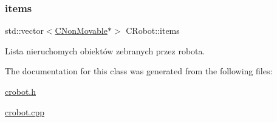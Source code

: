\subsubsection{\texorpdfstring{items}{items}}
{\footnotesize\ttfamily std\+::vector$<$\mbox{\hyperlink{class_c_non_movable}{C\+Non\+Movable}}$\ast$$>$ C\+Robot\+::items\hspace{0.3cm}{\ttfamily [protected]}}



Lista nieruchomych obiektów zebranych przez robota. 



The documentation for this class was generated from the following files\+:\begin{DoxyCompactItemize}
\item 
\mbox{\hyperlink{crobot_8h}{crobot.\+h}}\item 
\mbox{\hyperlink{crobot_8cpp}{crobot.\+cpp}}\end{DoxyCompactItemize}
